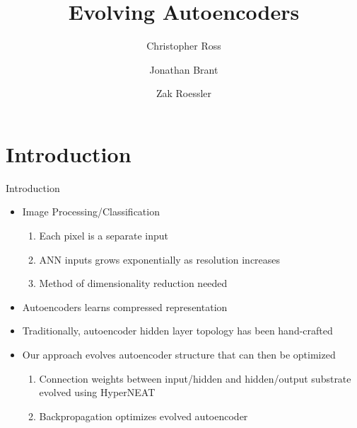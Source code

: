 \documentclass[xcolor=dvipsnames]{beamer}
\title{Evolving Autoencoders}
\author[Ross \and Brant \and Roessler]{Christopher Ross \and Jonathan Brant \and Zak Roessler}
\begin{document}
	\begin{frame}
		\titlepage
	\end{frame}
	
	\section{Introduction}
	\begin{frame}{Introduction}	
		\begin{itemize}
			\item Image Processing/Classification
			\begin{enumerate}
				\item Each pixel is a separate input
				\item ANN inputs grows exponentially as resolution increases
				\item Method of dimensionality reduction needed
			\end{enumerate}			
			\item Autoencoders learns compressed representation
			
			\item Traditionally, autoencoder hidden layer topology has been hand-crafted
			
			\item Our approach evolves autoencoder structure that can then be optimized			
			\begin{enumerate}
				\item Connection weights between input/hidden and hidden/output substrate evolved using HyperNEAT
				\item Backpropagation optimizes evolved autoencoder
			\end{enumerate}
		\end{itemize}
	\end{frame}
	
\end{document}
